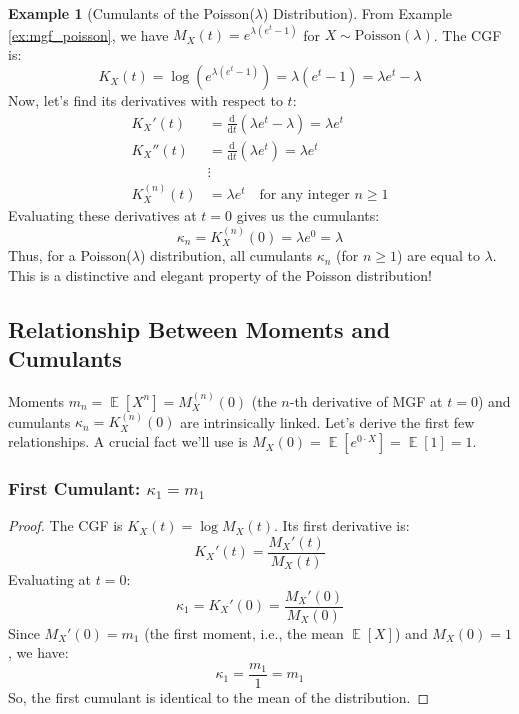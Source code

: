 \documentclass[11pt, letterpaper]{article}
\theoremstyle{plain} %
\theoremstyle{definition} %
\newtheorem{example}[theorem]{Example}
\theoremstyle{remark} %
\DeclareMathOperator{\E}{\mathbb{E}}
\newcommand{\dee}{\mathrm{d}} %
\newcommand{\Pois}{\mathrm{Poisson}}
\begin{document}
\begin{example}[Cumulants of the Poisson($\lambda$) Distribution]
\label{ex:cumulants_poisson}
From Example \ref{ex:mgf_poisson}, we have $M_X(t) = e^{\lambda(e^t-1)}$ for $X \sim \Pois(\lambda)$.
The CGF is:
\[ K_X(t) = \log(e^{\lambda(e^t-1)}) = \lambda(e^t-1) = \lambda e^t - \lambda \]
Now, let's find its derivatives with respect to $t$:
\begin{align*}
K_X'(t) &= \frac{\dee}{\dee t}(\lambda e^t - \lambda) = \lambda e^t \\
K_X''(t) &= \frac{\dee}{\dee t}(\lambda e^t) = \lambda e^t \\
&\vdots \\
K_X^{(n)}(t) &= \lambda e^t \quad \text{for any integer } n \ge 1
\end{align*}
Evaluating these derivatives at $t=0$ gives us the cumulants:
\[ \kappa_n = K_X^{(n)}(0) = \lambda e^0 = \lambda \]
Thus, for a Poisson($\lambda$) distribution, all cumulants $\kappa_n$ (for $n \ge 1$) are equal to $\lambda$. This is a distinctive and elegant property of the Poisson distribution!
\end{example}

\subsection{Relationship Between Moments and Cumulants}
\label{subsec:moments_cumulants_relation}

Moments $m_n = \E[X^n] = M_X^{(n)}(0)$ (the $n$-th derivative of MGF at $t=0$) and cumulants $\kappa_n = K_X^{(n)}(0)$ are intrinsically linked. Let's derive the first few relationships. A crucial fact we'll use is $M_X(0) = \E[e^{0 \cdot X}] = \E[1] = 1$.

\subsubsection{First Cumulant: $\kappa_1 = m_1$}
\begin{proof}
The CGF is $K_X(t) = \log M_X(t)$. Its first derivative is:
\[ K_X'(t) = \frac{M_X'(t)}{M_X(t)} \]
Evaluating at $t=0$:
\[ \kappa_1 = K_X'(0) = \frac{M_X'(0)}{M_X(0)} \]
Since $M_X'(0) = m_1$ (the first moment, i.e., the mean $\E[X]$) and $M_X(0)=1$, we have:
\[ \kappa_1 = \frac{m_1}{1} = m_1 \]
So, the first cumulant is identical to the mean of the distribution.
\end{proof}
\end{document}
